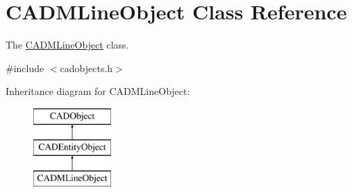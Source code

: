 \hypertarget{class_c_a_d_m_line_object}{}\section{C\+A\+D\+M\+Line\+Object Class Reference}
\label{class_c_a_d_m_line_object}


The \hyperlink{class_c_a_d_m_line_object}{C\+A\+D\+M\+Line\+Object} class.  




{\ttfamily \#include $<$cadobjects.\+h$>$}

Inheritance diagram for C\+A\+D\+M\+Line\+Object\+:\begin{figure}[H]
\begin{center}
\leavevmode
\includegraphics[height=3.000000cm]{class_c_a_d_m_line_object}
\end{center}
\end{figure}

